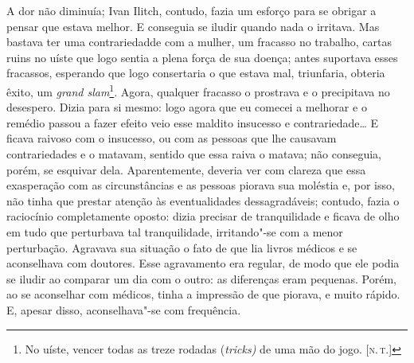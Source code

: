 A dor não diminuía; Ivan Ilitch, contudo, fazia um esforço para se
obrigar a pensar que estava melhor. E conseguia se iludir quando nada o
irritava. Mas bastava ter uma contrariedadde com a mulher, um fracasso
no trabalho, cartas ruins no uíste que logo sentia a plena força de sua
doença; antes suportava esses fracassos, esperando que logo consertaria
o que estava mal, triunfaria, obteria êxito, um \emph{grand
slam}\footnote{No uíste, vencer todas as treze rodadas (\emph{tricks)}
  de uma mão do jogo. {[}\textsc{n.\,t.}{]}}. Agora, qualquer fracasso o
prostrava e o precipitava no desespero. Dizia para si mesmo: logo agora
que eu comecei a melhorar e o remédio passou a fazer efeito veio esse
maldito insucesso e contrariedade\ldots{} E ficava raivoso com o insucesso,
ou com as pessoas que lhe causavam contrariedades e o matavam, sentido
que essa raiva o matava; não conseguia, porém, se esquivar dela.
Aparentemente, deveria ver com clareza que essa exasperação com as
circunstâncias e as pessoas piorava sua moléstia e, por isso, não tinha
que prestar atenção às eventualidades dessagradáveis; contudo, fazia o
raciocínio completamente oposto: dizia precisar de tranquilidade e
ficava de olho em tudo que perturbava tal tranquilidade, irritando"-se
com a menor perturbação. Agravava sua situação o fato de que lia livros
médicos e se aconselhava com doutores. Esse agravamento era regular, de
modo que ele podia se iludir ao comparar um dia com o outro: as
diferenças eram pequenas. Porém, ao se aconselhar com médicos, tinha a
impressão de que piorava, e muito rápido. E, apesar disso,
aconselhava"-se com frequência.

